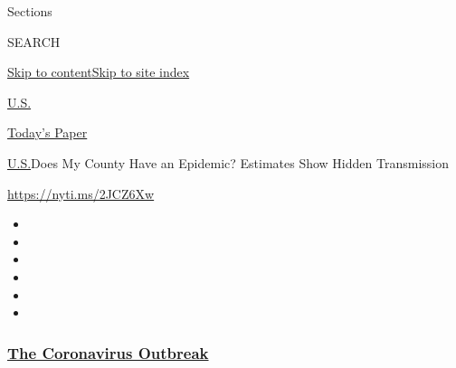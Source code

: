 Sections

SEARCH

\protect\hyperlink{site-content}{Skip to
content}\protect\hyperlink{site-index}{Skip to site index}

\href{https://www.nytimes3xbfgragh.onion/section/us}{U.S.}

\href{https://myaccount.nytimes3xbfgragh.onion/auth/login?response_type=cookie\&client_id=vi}{}

\href{https://www.nytimes3xbfgragh.onion/section/todayspaper}{Today's
Paper}

\href{/section/us}{U.S.}\textbar{}Does My County Have an Epidemic?
Estimates Show Hidden Transmission

\url{https://nyti.ms/2JCZ6Xw}

\begin{itemize}
\item
\item
\item
\item
\item
\item
\end{itemize}

\hypertarget{the-coronavirus-outbreak}{%
\subsubsection{\texorpdfstring{\href{https://www.nytimes3xbfgragh.onion/news-event/coronavirus?name=styln-coronavirus-national\&region=TOP_BANNER\&variant=undefined\&block=storyline_menu_recirc\&action=click\&pgtype=Interactive\&impression_id=3dcf04e0-e38e-11ea-b524-5975769cbb40}{The
Coronavirus
Outbreak}}{The Coronavirus Outbreak}}\label{the-coronavirus-outbreak}}

